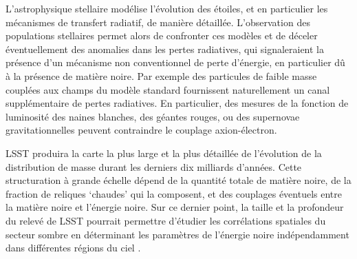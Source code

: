 \documentclass[12pt]{article}
\begin{document}
L'astrophysique stellaire modélise l'évolution des étoiles, et en particulier les mécanismes de transfert radiatif, de manière détaillée. L'observation des populations stellaires permet alors de confronter ces modèles et de déceler éventuellement des anomalies dans les pertes radiatives, qui signaleraient la présence d'un mécanisme non conventionnel de perte d'énergie, en particulier dû à la présence de matière noire. Par exemple des particules de faible masse couplées aux champs du modèle standard fournissent naturellement un canal supplémentaire de pertes radiatives. En particulier, des mesures de la fonction de luminosité des naines blanches, des géantes rouges, ou des supernovae gravitationnelles peuvent contraindre le couplage axion-électron.

 LSST produira la carte la plus large et la plus détaillée de l'évolution de la distribution de masse durant les derniers dix milliards d'années. Cette structuration à grande échelle dépend de la quantité totale de matière noire, de la fraction de reliques `chaudes' qui la composent, et des couplages éventuels entre la matière noire et l'énergie noire. Sur ce dernier point, la taille et la profondeur du relevé de LSST pourrait permettre d'étudier les corrélations spatiales du secteur sombre en déterminant les paramètres de l'énergie noire indépendamment dans différentes régions du ciel \citep{0902.2590}.

\end{document}

